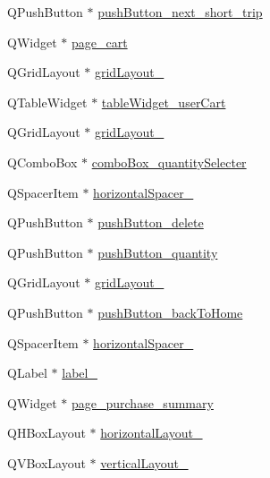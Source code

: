 \begin{DoxyCompactItemize}
\item 
Q\+Push\+Button $\ast$ \hyperlink{class_ui___main_window_abd9fbc912f43c31cd033026ad571d702}{push\+Button\+\_\+next\+\_\+short\+\_\+trip}
\item 
Q\+Widget $\ast$ \hyperlink{class_ui___main_window_a5b0421b84f92e2ef30f2bfa47c033a7b}{page\+\_\+cart}
\item 
Q\+Grid\+Layout $\ast$ \hyperlink{class_ui___main_window_a4495f53e7dd496615426ada2042c051b}{grid\+Layout\+\_}
\item 
Q\+Table\+Widget $\ast$ \hyperlink{class_ui___main_window_a57b32f9535fa5d3ee72997743a8ecfbc}{table\+Widget\+\_\+user\+Cart}
\item 
Q\+Grid\+Layout $\ast$ \hyperlink{class_ui___main_window_adbbd44debcfc24db144006951bf7b3e1}{grid\+Layout\+\_}
\item 
Q\+Combo\+Box $\ast$ \hyperlink{class_ui___main_window_ab448319d9067097fa6dd8b7c002275af}{combo\+Box\+\_\+quantity\+Selecter}
\item 
Q\+Spacer\+Item $\ast$ \hyperlink{class_ui___main_window_ad9d9bc0bd716858f45e1ea9b6c24d368}{horizontal\+Spacer\+\_}
\item 
Q\+Push\+Button $\ast$ \hyperlink{class_ui___main_window_a2500fe2fd32f4dacf8f737f0f624ddf6}{push\+Button\+\_\+delete}
\item 
Q\+Push\+Button $\ast$ \hyperlink{class_ui___main_window_af7e763badd8daae508fa44ed26d65fd0}{push\+Button\+\_\+quantity}
\item 
Q\+Grid\+Layout $\ast$ \hyperlink{class_ui___main_window_a16419b7fa6d38eb8c34d4a937c5d8ecd}{grid\+Layout\+\_}
\item 
Q\+Push\+Button $\ast$ \hyperlink{class_ui___main_window_ab9c15b00efa698b72f138302e327e9af}{push\+Button\+\_\+back\+To\+Home}
\item 
Q\+Spacer\+Item $\ast$ \hyperlink{class_ui___main_window_a0aaee1ce44c28028a2700a7545207e0f}{horizontal\+Spacer\+\_}
\item 
Q\+Label $\ast$ \hyperlink{class_ui___main_window_a29b781f23566d0f91b217459c06929ba}{label\+\_}
\item 
Q\+Widget $\ast$ \hyperlink{class_ui___main_window_a011c83a6fb5b7e6c96353f2a704e850e}{page\+\_\+purchase\+\_\+summary}
\item 
Q\+H\+Box\+Layout $\ast$ \hyperlink{class_ui___main_window_a8cfe172f7719cf363fc630c536cad6c3}{horizontal\+Layout\+\_}
\item 
Q\+V\+Box\+Layout $\ast$ \hyperlink{class_ui___main_window_a8cf1c6ec21e85d25d8ff8cfc84652568}{vertical\+Layout\+\_}

\end{DoxyCompactItemize}
